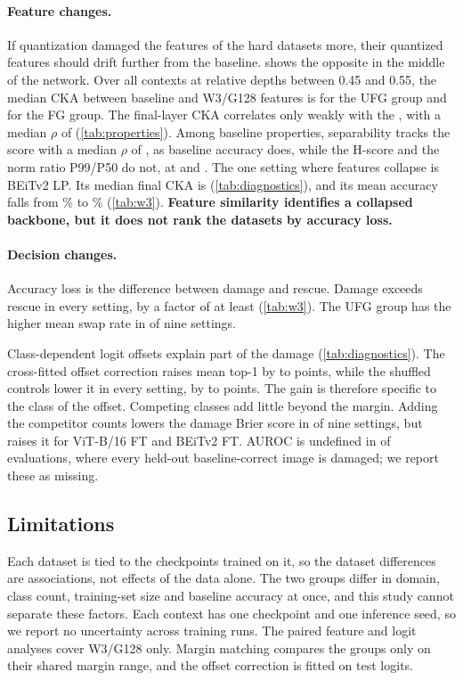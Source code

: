 \paragraph{Feature changes.}
If quantization damaged the features of the hard datasets more, their quantized features should drift further from the baseline.
 shows the opposite in the middle of the network.
Over all contexts at relative depths between 0.45 and 0.55, the median CKA between baseline and W3/G128 features is  for the UFG group and  for the FG group.
The final-layer CKA correlates only weakly with the , with a median $\rho$ of  (\cref{tab:properties}).
Among baseline properties, separability tracks the score with a median $\rho$ of , as baseline accuracy does, while the H-score and the norm ratio P99/P50 do not, at  and .
The one setting where features collapse is BEiTv2 LP.
Its median final CKA is  (\cref{tab:diagnostics}), and its mean accuracy falls from \% to \% (\cref{tab:w3}).
\textbf{Feature similarity identifies a collapsed backbone, but it does not rank the datasets by accuracy loss.}



\paragraph{Decision changes.}
Accuracy loss is the difference between damage and rescue.
Damage exceeds rescue in every setting, by a factor of at least  (\cref{tab:w3}).
The UFG group has the higher mean swap rate in  of nine settings.

Class-dependent logit offsets explain part of the damage (\cref{tab:diagnostics}).
The cross-fitted offset correction raises mean top-1 by  to  points, while the shuffled controls lower it in every setting, by  to  points.
The gain is therefore specific to the class of the offset.
Competing classes add little beyond the margin.
Adding the competitor counts lowers the damage Brier score in  of nine settings, but raises it for ViT-B/16 FT and BEiTv2 FT.
AUROC is undefined in  of  evaluations, where every held-out baseline-correct image is damaged; we report these as missing.

\subsection{Limitations}

Each dataset is tied to the checkpoints trained on it, so the dataset differences are associations, not effects of the data alone.
The two groups differ in domain, class count, training-set size and baseline accuracy at once, and this study cannot separate these factors.
Each context has one checkpoint and one inference seed, so we report no uncertainty across training runs.
The paired feature and logit analyses cover W3/G128 only.
Margin matching compares the groups only on their shared margin range, and the offset correction is fitted on test logits.
